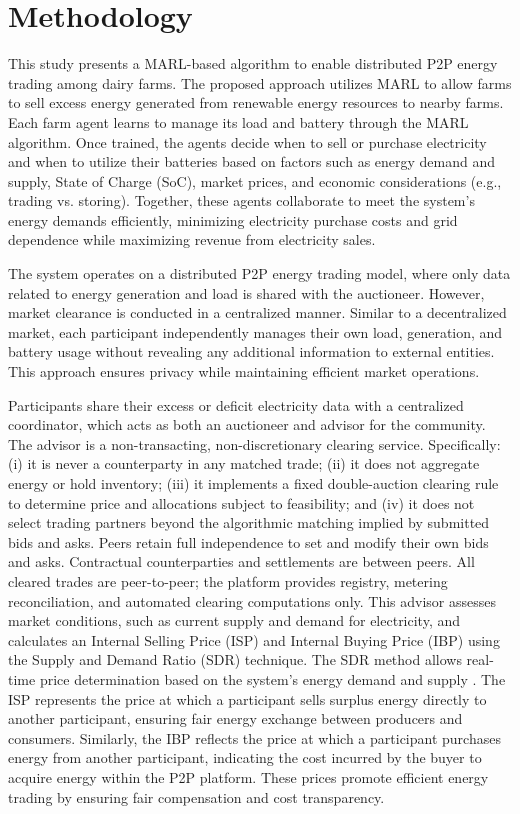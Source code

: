 \documentclass[preprint,12pt]{elsarticle}
\begin{document}
\section{Methodology}
\label{methodology}


This study presents a MARL-based algorithm to enable distributed P2P energy trading among dairy farms. The proposed approach utilizes MARL to allow farms to sell excess energy generated from renewable energy resources to nearby farms. Each farm agent learns to manage its load and battery through the MARL algorithm. Once trained, the agents decide when to sell or purchase electricity and when to utilize their batteries based on factors such as energy demand and supply, State of Charge (SoC), market prices, and economic considerations (e.g., trading vs. storing). Together, these agents collaborate to meet the system's energy demands efficiently, minimizing electricity purchase costs and grid dependence while maximizing revenue from electricity sales.

The system operates on a distributed P2P energy trading model, where only data related to energy generation and load is shared with the auctioneer. However, market clearance is conducted in a centralized manner. Similar to a decentralized market, each participant independently manages their own load, generation, and battery usage without revealing any additional information to external entities. This approach ensures privacy while maintaining efficient market operations.

Participants share their excess or deficit electricity data with a centralized coordinator, which acts as both an auctioneer and advisor for the community. The advisor is a non-transacting, non-discretionary clearing service. Specifically: (i) it is never a counterparty in any matched trade; (ii) it does not aggregate energy or hold inventory; (iii) it implements a fixed double-auction clearing rule to determine price and allocations subject to feasibility; and (iv) it does not select trading partners beyond the algorithmic matching implied by submitted bids and asks. Peers retain full independence to set and modify their own bids and asks. Contractual counterparties and settlements are between peers. All cleared trades are peer-to-peer; the platform provides registry, metering reconciliation, and automated clearing computations only. This advisor assesses market conditions, such as current supply and demand for electricity, and calculates an Internal Selling Price (ISP) and Internal Buying Price (IBP) using the Supply and Demand Ratio (SDR) technique. The SDR method allows real-time price determination based on the system's energy demand and supply \cite{liu2017energy}. The ISP represents the price at which a participant sells surplus energy directly to another participant, ensuring fair energy exchange between producers and consumers. Similarly, the IBP reflects the price at which a participant purchases energy from another participant, indicating the cost incurred by the buyer to acquire energy within the P2P platform. These prices promote efficient energy trading by ensuring fair compensation and cost transparency.
\end{document}

